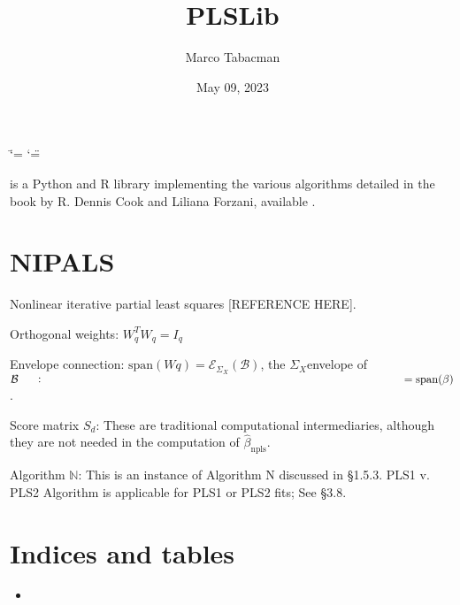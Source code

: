 \documentclass[letterpaper,10pt,english]{sphinxmanual}
\title{PLSLib}
\date{May 09, 2023}
\author{Marco Tabacman}
\begin{document}
\ifdefined\shorthandoff
  \ifnum\catcode`\=\string=\active\shorthandoff{=}\fi
  \ifnum\catcode`\"=\active{}\fi
\fi

\pagestyle{empty}
\sphinxmaketitle
\pagestyle{plain}
\sphinxtableofcontents
\pagestyle{normal}
\label{\detokenize{index::doc}}


\sphinxAtStartPar
{} is a Python and R library implementing the various algorithms detailed in the book  by R. Dennis Cook and Liliana Forzani, available .

\sphinxstepscope


\chapter{NIPALS}
\label{\detokenize{NIPALS:nipals}}\label{\detokenize{NIPALS::doc}}
\sphinxAtStartPar
Nonlinear iterative partial least squares {[}REFERENCE HERE{]}.

\begin{fulllineitems}
\label{\detokenize{NIPALS:NIPALS.nipals.nipals}}
\pysigstartsignatures
{}
\pysigstopsignatures
\sphinxAtStartPar
Orthogonal weights: \(W^T_q W_q = I_q\)

\sphinxAtStartPar
Envelope connection: \(\mathrm{span}(Wq) = \mathcal{E}_{Σ_X}(\mathcal{B})\), the \(Σ_X\)\sphinxhyphen{}envelope of \(\mathcal{B} \mathrel{\vcenter{:}}= \mathrm{span}(\beta)\).

\sphinxAtStartPar
Score matrix \(S_d\): These are traditional computational intermediaries,
although they are not needed in the computation of \(\hat{\beta}_{\mathrm{npls}}\).

\sphinxAtStartPar
Algorithm \(\mathbb{N}\): This is an instance of Algorithm N discussed in \S{}1.5.3.
PLS1 v. PLS2 Algorithm is applicable for PLS1 or PLS2 fits; See \S{}3.8.

\end{fulllineitems}



\chapter{Indices and tables}
\label{\detokenize{index:indices-and-tables}}\begin{itemize}
\item {} 
\sphinxAtStartPar
{}

\end{itemize}



\renewcommand{\indexname}{Index}
\printindex
\end{document}

